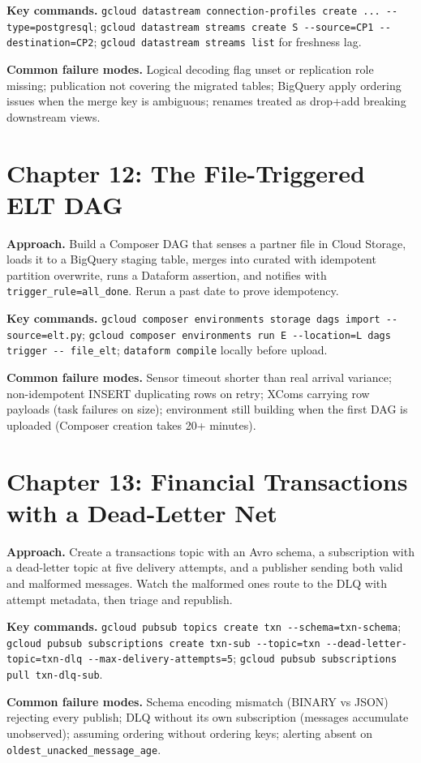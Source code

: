 \textbf{Key commands.} \texttt{gcloud datastream connection-profiles create ... -{}-type=postgresql};
\texttt{gcloud datastream streams create S -{}-source=CP1 -{}-destination=CP2};
\texttt{gcloud datastream streams list} for freshness lag.

\textbf{Common failure modes.} Logical decoding flag unset or replication role missing; publication
not covering the migrated tables; BigQuery apply ordering issues when the merge key is ambiguous;
renames treated as drop+add breaking downstream views.

\section{Chapter 12: The File-Triggered ELT DAG}
\textbf{Approach.} Build a Composer DAG that senses a partner file in Cloud Storage, loads it to a
BigQuery staging table, merges into curated with idempotent partition overwrite, runs a Dataform
assertion, and notifies with \texttt{trigger\_rule=all\_done}. Rerun a past date to prove
idempotency.

\textbf{Key commands.} \texttt{gcloud composer environments storage dags import -{}-source=elt.py};
\texttt{gcloud composer environments run E -{}-location=L dags trigger -{}- file\_elt};
\texttt{dataform compile} locally before upload.

\textbf{Common failure modes.} Sensor timeout shorter than real arrival variance; non-idempotent
INSERT duplicating rows on retry; XComs carrying row payloads (task failures on size); environment
still building when the first DAG is uploaded (Composer creation takes 20+ minutes).

\section{Chapter 13: Financial Transactions with a Dead-Letter Net}
\textbf{Approach.} Create a transactions topic with an Avro schema, a subscription with a
dead-letter topic at five delivery attempts, and a publisher sending both valid and malformed
messages. Watch the malformed ones route to the DLQ with attempt metadata, then triage and republish.

\textbf{Key commands.} \texttt{gcloud pubsub topics create txn -{}-schema=txn-schema};
\texttt{gcloud pubsub subscriptions create txn-sub -{}-topic=txn -{}-dead-letter-topic=txn-dlq
-{}-max-delivery-attempts=5}; \texttt{gcloud pubsub subscriptions pull txn-dlq-sub}.

\textbf{Common failure modes.} Schema encoding mismatch (BINARY vs JSON) rejecting every publish;
DLQ without its own subscription (messages accumulate unobserved); assuming ordering without
ordering keys; alerting absent on \texttt{oldest\_unacked\_message\_age}.

